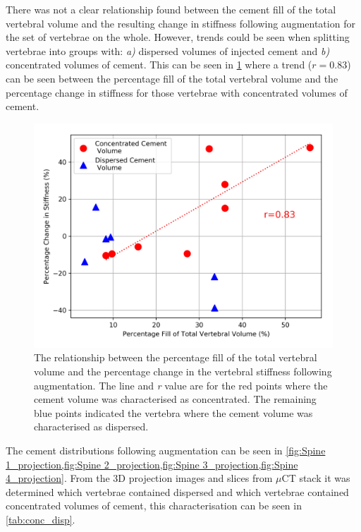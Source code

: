 There was not a clear relationship found between the cement fill of the total
vertebral volume and the resulting change in stiffness following augmentation
for the set of vertebrae on the whole.
However, trends could be seen when splitting vertebrae into groups with:
\textit{a)} dispersed volumes of injected cement and \textit{b)} concentrated
volumes of cement.
This can be seen in \cref{fig:aug_cmt_fill_vs_ch_stiff} where a trend
($r=0.83$) can be seen between the percentage fill of the total vertebral
volume and the percentage change in stiffness for those vertebrae with
concentrated volumes of cement.

\begin{figure}[ht!]
  \centering
 
\includegraphics[width=.7\textwidth]{Chapters/Chapter_HT_images/Aug_cmt_fill_vs_ch_stiff.png}
	\caption{The relationship between the percentage fill of the total vertebral
volume and the percentage change in the vertebral stiffness following
augmentation. The line and \textit{r} value are for the red points where the
cement volume was characterised as concentrated. The remaining blue points
indicated the vertebra where the cement volume was characterised as
dispersed.}
  \label{fig:aug_cmt_fill_vs_ch_stiff}
\end{figure}


The cement distributions following augmentation can be seen in \cref{fig:Spine
1_projection,fig:Spine 2_projection,fig:Spine 3_projection,fig:Spine
4_projection}.
From the 3D projection images and slices from $\mu$CT stack it was determined
which vertebrae contained dispersed and which vertebrae contained concentrated
volumes of cement, this characterisation can be seen in \cref{tab:conc_disp}.



